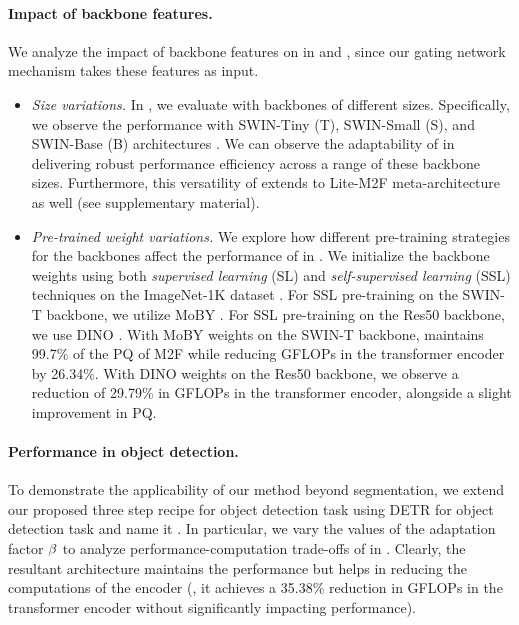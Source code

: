 \paragraph{Impact of backbone features.} We analyze the impact of backbone features on \ours in  and , since our gating network 
 mechanism takes these features as input. 
\begin{itemize}[topsep=0.0em,leftmargin=*]
\setlength\itemsep{0.0em}
    \item \textit{Size variations.} In , we evaluate {\ours} with backbones of different sizes. Specifically, we observe the performance with SWIN-Tiny (T), SWIN-Small (S), and SWIN-Base (B) architectures \cite{liu2021swin}. We can observe the adaptability of {\ours} in delivering robust performance efficiency across a range of these backbone sizes. Furthermore, this versatility of {\ours} extends to Lite-M2F meta-architecture as well (see supplementary material).
    \item \textit{Pre-trained weight variations.} We explore how different pre-training strategies for the backbones affect the performance of {\ours} in . We initialize the backbone weights using both \emph{supervised learning} (SL) and \emph{self-supervised learning} (SSL) techniques on the ImageNet-1K dataset \cite{deng2009imagenet}. For SSL pre-training on the SWIN-T \cite{liu2021swin} backbone, we utilize MoBY \cite{xie2021self}. For SSL pre-training on the Res50 \cite{he2016deep} backbone, we use DINO \cite{caron2021emerging}. With MoBY weights on the SWIN-T backbone, {\ours} maintains 99.7\% of the PQ of M2F while reducing GFLOPs in the transformer encoder by 26.34\%. With DINO weights on the Res50 backbone, we observe a reduction of 29.79\% in GFLOPs in the transformer encoder, alongside a slight improvement in PQ.
\end{itemize}
%

\paragraph{Performance in object detection.} To demonstrate the applicability of our method beyond segmentation, we extend our proposed three step recipe for object detection task using DETR \cite{carion2020end} for object detection task and name it \oursdetr. In particular, we vary the values of the adaptation factor $\beta$ to analyze performance-computation trade-offs of \oursdetr in . Clearly, the resultant architecture maintains the performance but helps in reducing the computations of the encoder (\eg, it achieves a 35.38\% reduction in GFLOPs in the transformer encoder without significantly impacting performance).

